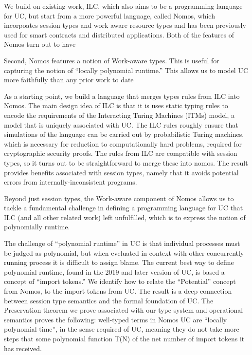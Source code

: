We build on existing work, ILC, which also aims to be a programming language for UC, but start from a more powerful language, called Nomos, which incorpoates session types and work aware resource types and has been previously used for  smart contracts and distributed applications.
Both of the features of Nomos turn out to have 

Second, Nomos features a notion of Work-aware types. This is useful for capturing the notion of “locally polynomial runtime.” This allows us to model UC more faithfully than any prior work to date

As a starting point, we build a language that merges types rules from ILC into Nomos. The main design idea of ILC is that it is uses static typing rules to encode the requirements of the Interacting Turing Machines (ITMs) model, a model that is uniquely associated with UC. The ILC rules roughly ensure that simulations of the language can be carried out by probabilistic Turing machines, which is necessary for reduction to computationally hard problems, required for cryptographic security proofs. The rules from ILC are compatible with session types, so it turns out to be straightforward to merge these into nomos. The result provides benefits associated with session types, namely that it avoids potential errors from internally-inconsistent programs.

   Beyond just session types, the Work-aware component of Nomos allows us to tackle a fundamental challenge in defining a programming language for UC that ILC (and all other related work) left unfulfilled, which is to express the notion of polynomially runtime.
   
   The challenge of “polynomial runtime” in UC is that individual processes must be judged as polynomial, but when eveluated in context with other concurrently running process it is difficult to assign blame.
       The current best way to define polynomial runtime, found in the 2019 and later version of UC, is based a concept of ``import tokens.''
   We identify how to relate the “Potential” concept from Nomos, to the import tokens from UC. 
	The result is a deep connection between session type semantics and the formal foundation of UC.
	The Preservation theorem we prove associated with our type system and operational semantics proves the following: 
well-typed terms in Nomos UC are “locally polynomial time”, in the sense required of UC, meaning they do not take more steps that some polynomial function T(N) of the net number of import tokens it has received.

